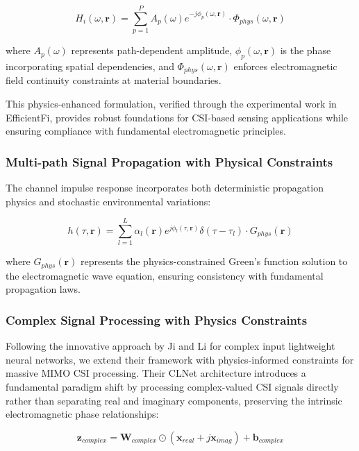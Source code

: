 \documentclass[journal]{IEEEtran}
\begin{document}
\begin{equation}
H_i(\omega,\mathbf{r}) = \sum_{p=1}^{P} A_p(\omega) e^{-j\phi_p(\omega,\mathbf{r})} \cdot \Phi_{phys}(\omega,\mathbf{r})
\label{eq:csi_physics}
\end{equation}

where $A_p(\omega)$ represents path-dependent amplitude, $\phi_p(\omega,\mathbf{r})$ is the phase incorporating spatial dependencies, and $\Phi_{phys}(\omega,\mathbf{r})$ enforces electromagnetic field continuity constraints at material boundaries.

This physics-enhanced formulation, verified through the experimental work in EfficientFi, provides robust foundations for CSI-based sensing applications while ensuring compliance with fundamental electromagnetic principles.

\subsubsection{Multi-path Signal Propagation with Physical Constraints}

The channel impulse response incorporates both deterministic propagation physics and stochastic environmental variations:

\begin{equation}
h(\tau,\mathbf{r}) = \sum_{l=1}^{L} \alpha_l(\mathbf{r}) e^{j\phi_l(\tau,\mathbf{r})} \delta(\tau - \tau_l) \cdot G_{phys}(\mathbf{r})
\label{eq:cir_physics}
\end{equation}

where $G_{phys}(\mathbf{r})$ represents the physics-constrained Green's function solution to the electromagnetic wave equation, ensuring consistency with fundamental propagation laws.

\subsubsection{Complex Signal Processing with Physics Constraints}

Following the innovative approach by Ji and Li \cite{ji2021clnet} for complex input lightweight neural networks, we extend their framework with physics-informed constraints for massive MIMO CSI processing. Their CLNet architecture introduces a fundamental paradigm shift by processing complex-valued CSI signals directly rather than separating real and imaginary components, preserving the intrinsic electromagnetic phase relationships:

\begin{equation}
\mathbf{z}_{complex} = \mathbf{W}_{complex} \odot (\mathbf{x}_{real} + j\mathbf{x}_{imag}) + \mathbf{b}_{complex}
\label{eq:clnet_complex}
\end{equation}
\end{document}
